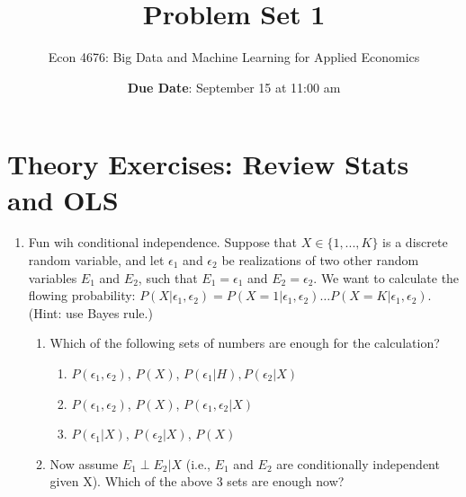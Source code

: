 \documentclass[12pt,onecolumn]{article}
\title{Problem Set 1}
\subtitle{Econ 4676: Big Data and Machine Learning for Applied Economics}
\author{{\bf Due Date}: September 15 at 11:00 am}
\date{}
\begin{document}
\maketitle

\section{Theory Exercises: Review Stats and OLS}

\begin{enumerate}

  \item Fun wih conditional independence.  Suppose that $X\in \{1,...,K\} $ is a discrete random variable, and let $\epsilon_1$ and $\epsilon_2$ be realizations of two other random variables $E_1$ and $E_2$, such that $E_1=\epsilon_1$ and $E_2=\epsilon_2$. We want to calculate the flowing probability: $P(X|\epsilon_1,\epsilon_2)= P(X=1|\epsilon_1,\epsilon_2)\dots  P(X=K|\epsilon_1,\epsilon_2)$. (Hint: use Bayes rule.)
  \begin{enumerate}
  \item Which of the following sets of numbers are enough for the calculation?
  \begin{enumerate}
    \item $P(\epsilon_1,\epsilon_2)$, $P(X)$, $P(\epsilon_1|H), P(\epsilon_2|X)$
    \item $P(\epsilon_1,\epsilon_2)$, $P(X)$, $P(\epsilon_1,\epsilon_2|X)$ 
    \item $P(\epsilon_1|X)$, $P(\epsilon_2|X)$, $P(X)$
    \end{enumerate}
    \item Now  assume $E_1 \perp E_2|X$ (i.e., $E_1$ and $E_2$ are conditionally independent given X). Which of the above 3 sets are enough now?
  \end{enumerate}

 


\end{enumerate}
\end{document}
